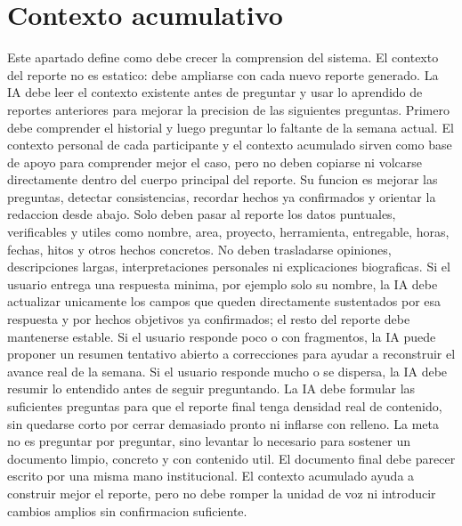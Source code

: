 \documentclass[11pt,a4paper]{article}
\begin{document}
\section{Contexto acumulativo}
Este apartado define como debe crecer la comprension del sistema. El contexto
del reporte no es estatico: debe ampliarse con cada nuevo reporte generado. La
IA debe leer el contexto existente antes de preguntar y usar lo aprendido de
reportes anteriores para mejorar la precision de las siguientes preguntas.
Primero debe comprender el historial y luego preguntar lo faltante de la semana
actual.
El contexto personal de cada participante y el contexto acumulado sirven como
base de apoyo para comprender mejor el caso, pero no deben copiarse ni
volcarse directamente dentro del cuerpo principal del reporte. Su funcion es
mejorar las preguntas, detectar consistencias, recordar hechos ya confirmados y
orientar la redaccion desde abajo.
Solo deben pasar al reporte los datos puntuales, verificables y utiles como
nombre, area, proyecto, herramienta, entregable, horas, fechas, hitos y otros
hechos concretos. No deben trasladarse opiniones, descripciones largas,
interpretaciones personales ni explicaciones biograficas.
Si el usuario entrega una respuesta minima, por ejemplo solo su nombre, la IA
debe actualizar unicamente los campos que queden directamente sustentados por
esa respuesta y por hechos objetivos ya confirmados; el resto del reporte debe
mantenerse estable.
Si el usuario responde poco o con fragmentos, la IA puede proponer un resumen
tentativo abierto a correcciones para ayudar a reconstruir el avance real de la
semana. Si el usuario responde mucho o se dispersa, la IA debe resumir lo
entendido antes de seguir preguntando.
La IA debe formular las suficientes preguntas para que el reporte final tenga
densidad real de contenido, sin quedarse corto por cerrar demasiado pronto ni
inflarse con relleno. La meta no es preguntar por preguntar, sino levantar lo
necesario para sostener un documento limpio, concreto y con contenido util.
El documento final debe parecer escrito por una misma mano institucional. El
contexto acumulado ayuda a construir mejor el reporte, pero no debe romper la
unidad de voz ni introducir cambios amplios sin confirmacion suficiente.
\end{document}
